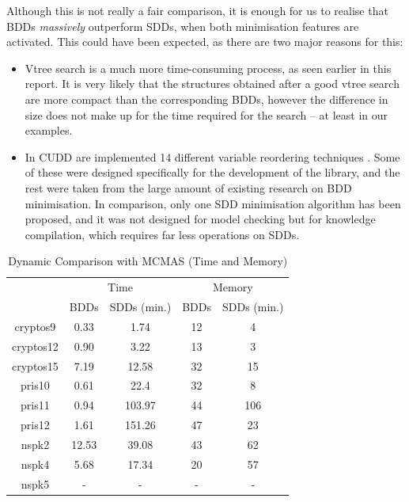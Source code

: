 \documentclass[11pt]{report}
\begin{document}
Although this is not really a fair comparison, it is enough for us to realise that BDDs \textit{massively} outperform SDDs, when both minimisation features are activated. This could have been expected, as there are two major reasons for this: \begin{itemize}
\item Vtree search is a much more time-consuming process, as seen earlier in this report. It is very likely that the structures obtained after a good vtree search are more compact than the corresponding BDDs, however the difference in size does not make up for the time required for the search -- at least in our examples.
\item In CUDD are implemented 14 different variable reordering techniques \cite{CUDD_website}. Some of these were designed specifically for the development of the library, and the rest were taken from the large amount of existing research on BDD minimisation. In comparison, only one SDD minimisation algorithm has been proposed, and it was not designed for model checking but for knowledge compilation, which requires far less operations on SDDs. 
\end{itemize}



\begin{table}
\centering
\begin{tabular}{|*{5}{c|}}
\hline
 & \multicolumn{2}{c|}{Time} & \multicolumn{2}{c|}{Memory} \\ \cline{2-5}
 & BDDs & SDDs (min.) & BDDs & SDDs (min.) \\ \hline
cryptos9 & 0.33 & 1.74 & 12 & 4 \\ \hline
cryptos12 & 0.90 & 3.22  & 13 & 3 \\ \hline
cryptos15 & 7.19 & 12.58 & 32 & 15 \\ \hline
pris10 & 0.61 & 22.4 & 32 & 8\\ \hline
pris11 & 0.94 & 103.97 & 44 & 106 \\ \hline
pris12 & 1.61 & 151.26 & 47 & 23 \\ \hline
nspk2 & 12.53 & 39.08 & 43 & 62 \\ \hline
nspk4 & 5.68 & 17.34 & 20 & 57 \\ \hline
nspk5 & - & - & -& - \\ \hline
\end{tabular}

\caption{Dynamic Comparison with MCMAS (Time and Memory)}
\label{table:dynamiccomparisonwithmcmas}
\end{table}
\end{document}
